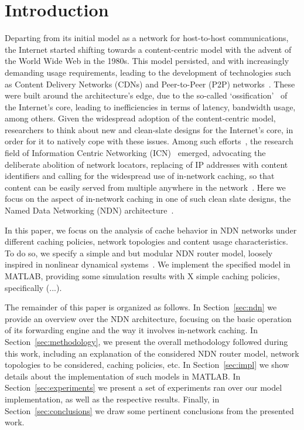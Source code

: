 \section{Introduction}
\label{sec:intro}

Departing from its initial model as a network for host-to-host communications, 
the Internet started shifting towards a content-centric model with the advent of 
the World Wide Web in the 1980s. This model persisted, 
and with increasingly demanding usage requirements, leading to the 
development of technologies such as 
Content Delivery Networks (CDNs) and Peer-to-Peer (P2P) 
networks~\cite{Passarella20121}. These were built around the architecture's 
edge, due to the so-called 
`ossification'~\cite{Handley:2006:WIO:1188052.1188101} of the Internet's core, 
leading to inefficiencies in terms of latency, bandwidth usage, among others. 
Given the widespread adoption of the content-centric model, 
researchers to think about new and clean-slate designs 
for the Internet's core, in order for it to natively cope with these issues. Among 
such efforts~\cite{5936152}, the research field of Information Centric Networking 
(ICN)~\cite{Xylomenos2013} emerged, 
advocating the deliberate abolition of network locators, replacing of IP 
addresses with content identifiers and calling for the widespread use of 
in-network caching, so that content can be easily served from multiple 
anywhere in the network~\cite{Koponen2007,Jacobson2009,Trossen2012,
Raychaudhuri2012,Han2012,Dannewitz:2013:NII:2459510.2459643}. Here we focus on the aspect of 
in-network caching in one of such clean slate designs, 
the Named Data Networking (NDN) architecture~\cite{Jacobson2009}.\shortvertbreak

In this paper, we focus on the analysis of cache behavior in NDN 
networks under different caching policies, network topologies and content 
usage characteristics. To do so, we specify a simple and but modular NDN router 
model, loosely inspired in nonlinear dynamical 
systems~\cite{Hedrick2010}. We implement the specified model in MATLAB, providing 
some simulation results with X simple caching policies, specifically (...).\shortvertbreak

The remainder of this paper is organized as follows. In Section~\ref{sec:ndn} we provide an 
overview over the NDN architecture, focusing on the basic operation of its 
forwarding engine and the way it involves in-network caching. In 
Section~\ref{sec:methodology}, we present the overall methodology followed 
during this work, including an explanation of the considered NDN router model, 
network topologies to be considered, caching policies, etc. In 
Section~\ref{sec:impl} we show details about the implementation of 
such models in MATLAB. In Section~\ref{sec:experiments} we present a set of 
experiments ran over our model implementation, as well as the respective 
results. Finally, in Section~\ref{sec:conclusions} we draw some pertinent 
conclusions from the presented work.
